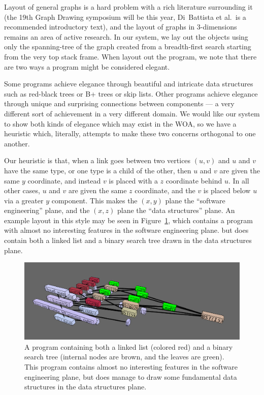 \documentclass[11pt]{article}
\begin{document}
Layout of general graphs is a hard problem with a rich literature surrounding
it (the 19th Graph Drawing symposium will be this year, Di~Battista et
al.\cite{gd}\ is a recommended introductory text), and the layout of graphs in
3-dimensions remains an area of active research.  In our system, we lay out the
objects using only the spanning-tree of the graph created from a breadth-first
search starting from the very top stack frame.  When layout out the program, we
note that there are two ways a program might be considered elegant. 

Some programs achieve elegance through beautiful and intricate data structures
such as red-black trees or B+ trees or skip lists.  Other programs achieve
elegance through unique and surprising connections between components --- a very
different sort of achievement in a very different domain.  We would like our
system to show both kinds of elegance which may exist in the WOA, so we have a
heuristic which, literally, attempts to make these two concerns orthogonal to
one another.

Our heuristic is that, when a link goes between two vertices $(u,v)$ and $u$ and $v$ have the same type, or one type is a child of the other, then $u$ and $v$ are given the same $y$ coordinate, and instead $v$ is placed with a $z$ coordinate behind $u$.  In all other cases, $u$ and $v$ are given the same $z$ coordinate, and the $v$ is placed below $u$ via a greater $y$ component.  This makes the $(x,y)$ plane the ``software engineering'' plane, and the $(x,z)$ plane the ``data structures'' plane.  An example layout in this style may be seen in Figure~\ref{fig:basic}, which contains a program with almost no interesting features in the software engineering plane. but does contain both a linked list and a binary search tree drawn in the data structures plane.  

\begin{figure}
\begin{center}
\includegraphics[width=5in]{figures/basic.png}
\end{center}
\caption{A program containing both a linked list (colored red) and a binary search tree (internal nodes are brown, and the leaves are green).  This program contains almost no interesting features in the software engineering plane, but does manage to draw some fundamental data structures in the data structures plane.}
\label{fig:basic}
\end{figure}
\end{document}
